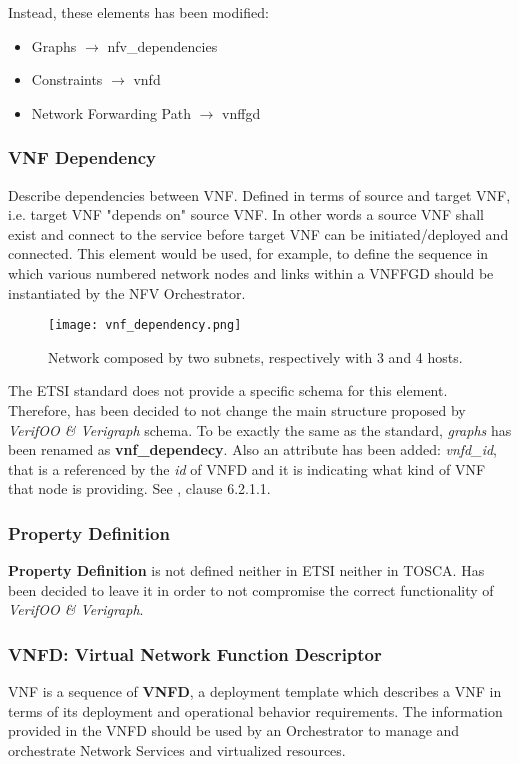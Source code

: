 \documentclass[11pt, english]{article}
\begin{document}
Instead, these elements has been modified:
\begin{itemize}
    \item Graphs $\rightarrow$ nfv\_dependencies
    \item Constraints $\rightarrow$ vnfd
    \item Network Forwarding Path $\rightarrow$ vnffgd
\end{itemize}

\subsubsection{VNF Dependency}
Describe dependencies between VNF. Defined in terms of source and target VNF, i.e. target VNF "depends on" source VNF. In other words a source VNF shall exist and connect to the service before target VNF can be initiated/deployed and connected. This element would be used, for example, to define the sequence in which various numbered network nodes and links within a VNFFGD should be instantiated by the NFV Orchestrator.

\begin{center}
    \begin{figure}[h!]
        \centering
    	\texttt{[image: vnf\_dependency.png]}
    	\caption{Network composed by two subnets, respectively with 3 and 4 hosts.} \label{Fig1}
    \end{figure}
\end{center}

The ETSI standard does not provide a specific schema for this element. Therefore, has been decided to not change the main structure proposed by \emph{VerifOO \& Verigraph} schema. To be exactly the same as the standard, \textit{graphs} has been renamed as \textbf{vnf\_dependecy}. Also an attribute has been added: \textit{vnfd\_id}, that is a referenced by the \textit{id} of VNFD and it is indicating what kind of VNF that node is providing. See \cite{etsi}, clause 6.2.1.1.

\newpage
\subsubsection{Property Definition}
\textbf{Property Definition} is not defined neither in ETSI neither in TOSCA. Has been decided to leave it in order to not compromise the correct functionality of \emph{VerifOO \& Verigraph}.

\subsubsection{VNFD: Virtual Network Function Descriptor}
VNF is a sequence of \textbf{VNFD}, a deployment template which describes a VNF in terms of its deployment and operational behavior requirements. The information provided in the VNFD should be used by an Orchestrator to manage and orchestrate Network Services and virtualized resources.
\end{document}
